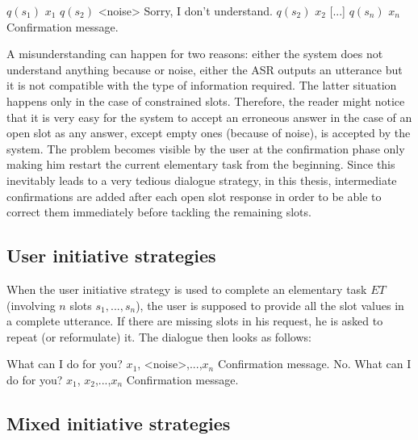 		\begin{dialogue}
			 $q(s_1)$
			 $x_1$
			 $q(s_2)$
			 Sorry, I don't understand. $q(s_2)$
			 $x_2$
			[...]
			 $q(s_n)$
			 $x_n$
			 Confirmation message.
		\end{dialogue}
		
		A misunderstanding can happen for two reasons: either the system does not understand anything because or noise, either the ASR outputs an utterance but it is not compatible with the type of information required. The latter situation happens only in the case of constrained slots. Therefore, the reader might notice that it is very easy for the system to accept an erroneous answer in the case of an open slot as any answer, except empty ones (because of noise), is accepted by the system. The problem becomes visible by the user at the confirmation phase only making him restart the current elementary task from the beginning. Since this inevitably leads to a very tedious dialogue strategy, in this thesis, intermediate confirmations are added after each open slot response in order to be able to correct them immediately before tackling the remaining slots.
	
	\subsection{User initiative strategies}
	
		When the user initiative strategy is used to complete an elementary task $ET$ (involving $n$ slots $s_1,...,s_n$), the user is supposed to provide all the slot values in a complete utterance. If there are missing slots in his request, he is asked to repeat (or reformulate) it. The dialogue then looks as follows:
		
		\begin{dialogue}
			 What can I do for you?
			 $x_1$, <noise>,...,$x_n$
			 Confirmation message.
			\speak{USER} No.
			 What can I do for you?
			 $x_1$, $x_2$,...,$x_n$
			 Confirmation message.
		\end{dialogue}
	
	\subsection{Mixed initiative strategies}
	
